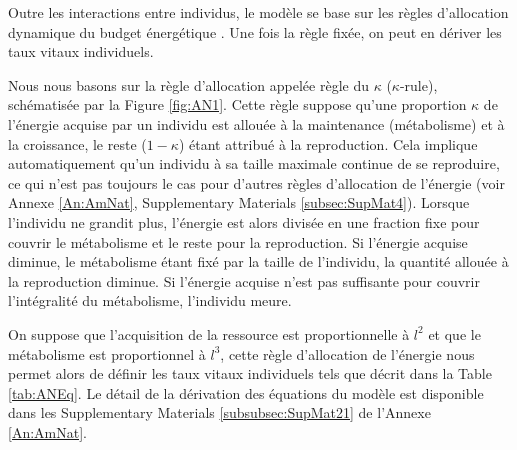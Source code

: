 Outre les interactions entre individus, le modèle se base sur les règles
d'allocation dynamique du budget énergétique \autocites{kooijman2000a}. Une fois la règle fixée, on peut en
dériver les taux vitaux individuels. 

Nous nous basons sur la règle d'allocation appelée règle du
$\kappa$ ($\kappa$-rule), schématisée par la Figure \ref{fig:AN1}. Cette règle
suppose qu'une proportion $\kappa$ de l'énergie acquise par un individu est
allouée à la maintenance (métabolisme) et à la croissance, le reste ($1-\kappa$)
étant attribué à la reproduction. Cela implique automatiquement qu'un individu à sa
taille maximale continue de se reproduire, ce qui n'est pas toujours le cas pour
d'autres règles d'allocation de l'énergie (voir Annexe \ref{An:AmNat},
Supplementary Materials \ref{subsec:SupMat4}). Lorsque l'individu ne grandit
plus, l'énergie est alors divisée en une fraction fixe pour couvrir le
métabolisme et le reste pour la reproduction. Si l'énergie acquise diminue, le
métabolisme étant fixé par la taille de l'individu, la quantité
allouée à la reproduction diminue. Si l'énergie acquise n'est pas suffisante
pour couvrir l'intégralité du métabolisme, l'individu meure.

On suppose que l'acquisition de la ressource est proportionnelle à $l^2$
et que le métabolisme est proportionnel à $l^3$, cette règle d'allocation de
l'énergie nous permet alors de définir les taux vitaux individuels tels que
décrit dans la Table \ref{tab:ANEq}. Le détail de la dérivation des équations du modèle
est disponible dans les Supplementary Materials \ref{subsubsec:SupMat21} de
l'Annexe \ref{An:AmNat}. 

